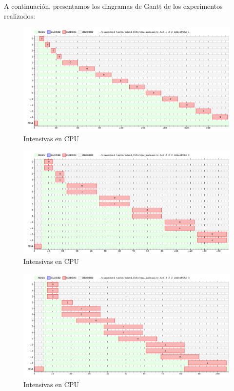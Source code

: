 \documentclass[11pt, a4paper, twoside]{article}
\begin{document}
A continuación, presentamos los diagramas de Gantt de los experimentos realizados: 

\begin{figure}[H]
  \includegraphics [width=\textwidth]{../graficos/sched_fcfs/cpu_intensivo.png}
  \caption{Intensivas en CPU}
\end{figure}
\begin{figure}[H]
  \includegraphics [width=\textwidth]{../graficos/sched_fcfs/cpu_intensivo2.png}
  \caption{Intensivas en CPU}
  \label{fig:intensivas-2cpu}
\end{figure}
\begin{figure}[H]
  \includegraphics [width=\textwidth]{../graficos/sched_fcfs/cpu_intensivo3.png}
  \caption{Intensivas en CPU}
\end{figure}
\end{document}
